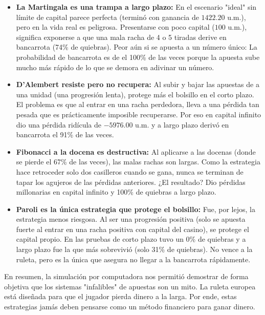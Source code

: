 \documentclass{article}
\begin{document}
\begin{itemize}
    \item \textbf{La Martingala es una trampa a largo plazo:} En el escenario "ideal" sin límite de capital parece perfecta (terminó con ganancia de $1422.20$ u.m.), pero en la vida real es peligrosa. Presentarse con poco capital ($100$ u.m.), significa exponerse a que una mala racha de 4 o 5 tiradas derive en bancarrota (74\% de quiebras). Peor aún si se apuesta a un número único: La probabilidad de bancarrota es de el 100\% de las veces porque la apuesta sube mucho más rápido de lo que se demora en adivinar un número.
    
    \item \textbf{D'Alembert resiste pero no recupera:} Al subir y bajar las apuestas de a una unidad (una progresión lenta), protege más el bolsillo en el corto plazo. El problema es que al entrar en una racha perdedora, lleva a una pérdida tan pesada que es prácticamente imposible recuperarse. Por eso en capital infinito dio una pérdida ridícula de $-5976.00$ u.m. y a largo plazo derivó en bancarrota el 91\% de las veces.
    
    \item \textbf{Fibonacci a la docena es destructiva:} Al aplicarse a las docenas (donde se pierde el 67\% de las veces), las malas rachas son largas. Como la estrategia hace retroceder solo dos casilleros cuando se gana, nunca se terminan de tapar los agujeros de las pérdidas anteriores. ¿El resultado? Dio pérdidas millonarias en capital infinito y 100\% de quiebras a largo plazo. 
    
    \item \textbf{Paroli es la única estrategia que protege el bolsillo:} Fue, por lejos, la estrategia menos riesgosa. Al ser una progresión positiva (solo se apuesta fuerte al entrar en una racha positiva con capital del casino), se protege el capital propio. En las pruebas de corto plazo tuvo un 0\% de quiebras y a largo plazo fue la que más sobrevivió (solo 31\% de quiebras). No vence a la ruleta, pero es la única que asegura no llegar a la bancarrota rápidamente.
\end{itemize}

En resumen, la simulación por computadora nos permitió demostrar de forma objetiva que los sistemas "infalibles" de apuestas son un mito. La ruleta europea está diseñada para que el jugador pierda dinero a la larga. Por ende, estas estrategias jamás deben pensarse como un método financiero para ganar dinero.
\end{document}

